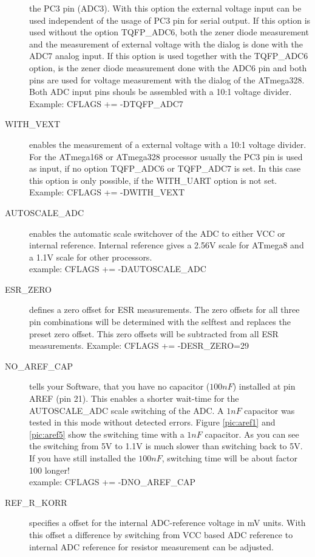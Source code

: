 \begin{description}
the PC3 pin (ADC3).
With this option the external voltage input can be used independent of the usage of PC3 pin for serial output.
If this option is used without the option TQFP\_ADC6, both the zener diode measurement and the measurement of external voltage
with the dialog is done with the ADC7 analog input.
If this option is used together with the TQFP\_ADC6 option, is the zener diode measurement done with the ADC6 pin and
both pins are used for voltage measurement with the dialog of the ATmega328.
Both ADC input pins shouls be assembled with a 10:1 voltage divider.\\
Example: CFLAGS += -DTQFP\_ADC7
  \item[WITH\_VEXT] enables the measurement of a external voltage with a 10:1 voltage divider.
For the ATmega168 or ATmega328 processor usually the PC3 pin is used as input, if no option TQFP\_ADC6 or
TQFP\_ADC7 is set. In this case this option is only possible, if the WITH\_UART option is not set.\\
Example: CFLAGS += -DWITH\_VEXT 
  \item[AUTOSCALE\_ADC] enables the automatic scale switchover of the ADC to either VCC or internal reference.
Internal reference gives a 2.56V scale for ATmega8 and a 1.1V scale for other processors.\\
example: CFLAGS += -DAUTOSCALE\_ADC
  \item[ESR\_ZERO] defines a zero offset for ESR measurements.
The zero offsets for all three pin combinations will be determined with the selftest and replaces the preset zero offset.
This zero offsets will be subtracted from all ESR measurements.
Example: CFLAGS += -DESR\_ZERO=29
  \item[NO\_AREF\_CAP] tells your Software, that you have no capacitor (\(100 nF\)) installed at pin AREF (pin 21).
This enables a shorter wait-time for the AUTOSCALE\_ADC scale switching of the ADC.
A \(1 nF\) capacitor was tested in this mode without detected errors.
Figure \ref{pic:aref1} and \ref{pic:aref5} show the switching time with a \(1 nF\) capacitor.
As you can see the switching from 5V to 1.1V is much slower than switching back to 5V. If you
have still installed the \(100 nF\), switching time will be about factor 100 longer!\\
example: CFLAGS += -DNO\_AREF\_CAP
  \item[REF\_R\_KORR] specifies a offset for the internal ADC-reference voltage in mV units.
With this offset a difference by switching from VCC based ADC reference to internal ADC reference for resistor measurement can be adjusted.

\end{description}
